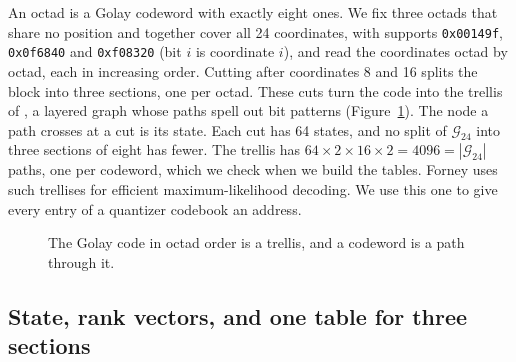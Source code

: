 An octad is a Golay codeword with exactly eight ones. We fix three octads that
share no position and together cover all 24 coordinates, with supports
\texttt{0x00149f}, \texttt{0x0f6840} and \texttt{0xf08320} (bit $i$ is
coordinate $i$), and read the coordinates octad by octad, each in increasing
order. Cutting after coordinates 8 and 16 splits the block
into three sections, one per octad. These cuts turn the code into the trellis
of \citet{forney1988}, a layered graph whose paths spell out bit patterns
(Figure~\ref{fig:geom}). The node a path crosses at a cut is its state. Each
cut has 64 states, and no split of $\mathcal{G}_{24}$ into three sections of
eight has fewer. The trellis has $64\times2\times16\times2 = 4096 =
|\mathcal{G}_{24}|$ paths, one per codeword, which we check when we build the
tables. Forney uses such trellises for efficient maximum-likelihood decoding.
We use this one to give every entry of a quantizer codebook an address.

\begin{figure}[t]
\centering
{}
\caption{The Golay code in octad order is a trellis, and a codeword is a path
through it.}
\label{fig:geom}
\end{figure}

\subsection{State, rank vectors, and one table for three sections}
\label{sec:state}


